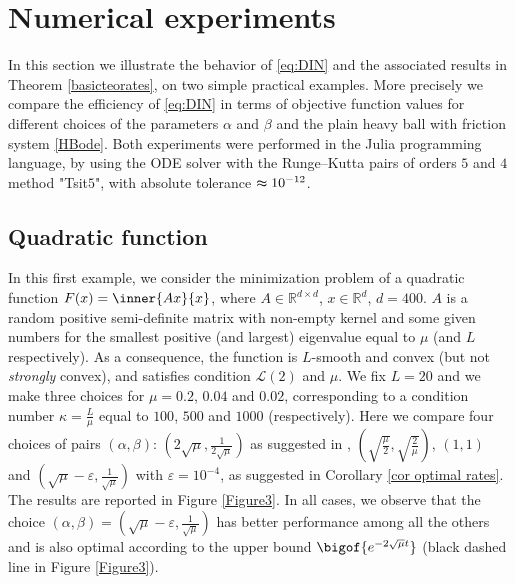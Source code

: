 \documentclass[reqno]{amsart}
\theoremstyle{plain}
\theoremstyle{definition}
\theoremstyle{remark}
\newcommand{\R}{\mathbb{R}}	%
\newcommand{\eps}{\varepsilon}	%
\begin{document}
\section{Numerical experiments}
\label{sec:numerics}


In this section we illustrate the behavior of \eqref{eq:DIN} and the associated results in Theorem \ref{basicteorates}, on two simple practical examples. More precisely we compare the efficiency of \eqref{eq:DIN} in terms of objective function values for different choices of the parameters $\alpha$ and $\beta$ and the plain heavy ball with friction system \eqref{HBode}. Both experiments were performed in the Julia programming language, by using the ODE solver with the Runge–Kutta pairs of orders $5$ and $4$ method "Tsit$5$", with absolute tolerance $\thickapprox 10^{-12}$.

\subsection{Quadratic function}
In this first example, we consider the minimization problem of a quadratic function $F(x)=\inner{Ax}{x}$, where $A\in\R^{d\times d}$, $x\in \R^{d}$, $d=400$. $A$ is a random positive semi-definite matrix with non-empty kernel and some given numbers for the smallest positive (and largest) eigenvalue equal to $\mu$ (and $L$ respectively). As a consequence, the function is $L$-smooth and convex (but not \textit{strongly} convex), and satisfies condition \hyperref[PL]{$\mathcal{L}(2)$} and $\mu$. We fix $L=20$ and we make three choices for $\mu = 0.2$, $0.04$ and $0.02$, corresponding to a condition number $\kappa = \frac{L}{\mu}$ equal to $100$, $500$ and $1000$ (respectively). Here we compare four choices of pairs $(\alpha,\beta)$: $(2\sqrt{\mu},\frac{1}{2\sqrt{\mu}})$ as suggested in \cite{attouch2022first}, $(\sqrt{\frac{\mu}{2}},\sqrt{\frac{2}{\mu}})$, $(1,1)$ and $(\sqrt{\mu}-\eps,\frac{1}{\sqrt{\mu}})$ with $\eps=10^{-4}$, as suggested in Corollary \ref{cor optimal rates}. The results are reported in Figure \ref{Figure3}. In all cases, we observe that the choice $(\alpha,\beta)=(\sqrt{\mu}-\eps,\frac{1}{\sqrt{\mu}})$ has better performance among all the others and is also optimal according to the upper bound $\bigof{e^{-2\sqrt{\mu}t}}$ (black dashed line in Figure \ref{Figure3}). 
\end{document}
